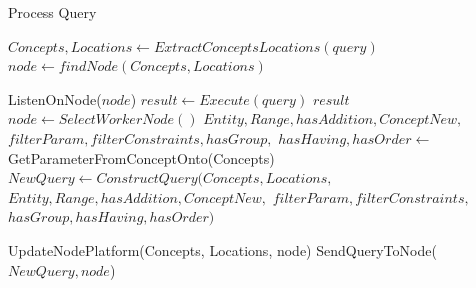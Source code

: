 \documentclass[5p,times]{elsarticle}
\begin{document}
\begin{algorithm}[t]
  \caption{Process Query}\label{alg:conceptQuery}
  \begin{algorithmic}[1]
  
        \State $Concepts, Locations \gets ExtractConceptsLocations(query)$
        \State $node \gets findNode(Concepts, Locations)$
  
            \State ListenOnNode($node$)
            \State $result \gets Execute(query)$
            \State \Return $result$
        \Else
            \State $node \gets SelectWorkerNode()$
            \State $Entity, Range, hasAddition, ConceptNew,$
            \Statex \hspace{1em} $filterParam, filterConstraints, hasGroup,$
            \Statex \hspace{1em} $hasHaving, hasOrder \gets$
            \Statex \hspace{1em} GetParameterFromConceptOnto(Concepts)
            \State $NewQuery \gets ConstructQuery(Concepts, Locations,$
            \Statex \hspace{1em} $Entity, Range, hasAddition, ConceptNew,$
            \Statex \hspace{1em} $filterParam, filterConstraints,$
            \Statex \hspace{1em} $hasGroup, hasHaving, hasOrder)$
  
            \State UpdateNodePlatform(Concepts, Locations, node)
            \State SendQueryToNode($NewQuery, node$)
        \EndIf
    \EndWhile
  \EndProcedure
  
  \end{algorithmic}
\end{algorithm}
\end{document}
